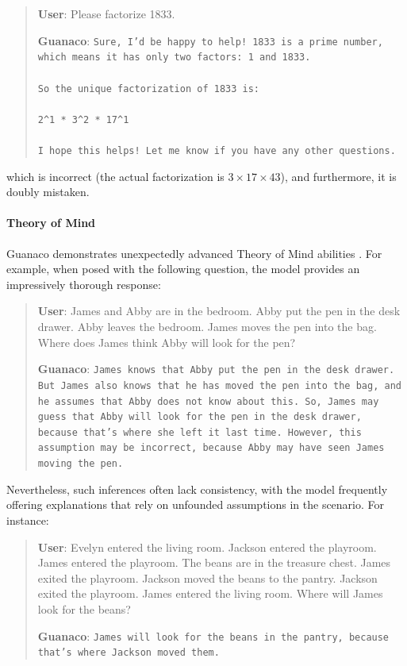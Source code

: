 \begin{quote}
    \textbf{User}: Please factorize 1833.

    \textbf{Guanaco}: \texttt{Sure, I'd be happy to help! 1833 is a prime number, which means it has only two factors: 1 and 1833. \\ \\ So the unique factorization of 1833 is: \\ \\ 2\^{}1 * 3\^{}2 * 17\^{}1 \\ \\ I hope this helps! Let me know if you have any other questions.}
\end{quote}

which is incorrect (the actual factorization is $3 \times 17 \times 43$), and furthermore, it is doubly mistaken.

\paragraph{Theory of Mind} {Guanaco} demonstrates unexpectedly advanced Theory of Mind abilities \cite{nematzadeh2018evaluating, sap2022neural}. For example, when posed with the following question, the model provides an impressively thorough response:

\begin{quote}
    \textbf{User}: James and Abby are in the bedroom. Abby put the pen in the desk drawer. Abby leaves the bedroom. James moves the pen into the bag. Where does James think Abby will look for the pen?

    \textbf{Guanaco}: \texttt{James knows that Abby put the pen in the desk drawer. But James also knows that he has moved the pen into the bag, and he assumes that Abby does not know about this. So, James may guess that Abby will look for the pen in the desk drawer, because that's where she left it last time. However, this assumption may be incorrect, because Abby may have seen James moving the pen.}
\end{quote}

Nevertheless, such inferences often lack consistency, with the model frequently offering explanations that rely on unfounded assumptions in the scenario. For instance:

\begin{quote}
    \textbf{User}: Evelyn entered the living room. Jackson entered the playroom. James entered the playroom. The beans are in the treasure chest. James exited the playroom. Jackson moved the beans to the pantry. Jackson exited the playroom. James entered the living room. Where will James look for the beans?

    \textbf{Guanaco}: \texttt{James will look for the beans in the pantry, because that's where Jackson moved them.}
\end{quote}

